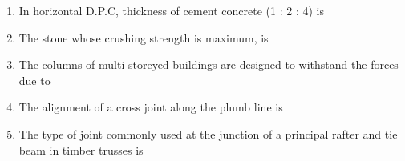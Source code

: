 \documentclass[11pt,a4paper]{article}
\begin{document}
\begin{enumerate}
\item{In horizontal D.P.C, thickness of cement concrete (1 : 2 : 4) is}
\\\begin{enumerate*}[itemjoin=\qquad, label=\Alph*.]
\item{2 cm}
\item{4 cm}
\item{6 cm}
\item{8 cm}
\end{enumerate*}
\item{The stone whose crushing strength is maximum, is}
\\
\item{The columns of multi-storeyed buildings are designed to withstand the forces due to}
\\
\item{The alignment of a cross joint along the plumb line is}
\\
\item{The type of joint commonly used at the junction of a principal rafter and tie beam in timber trusses is}
\begin{enumerate}[label=\Alph*.]

\end{enumerate}
\end{enumerate}
\end{document}
